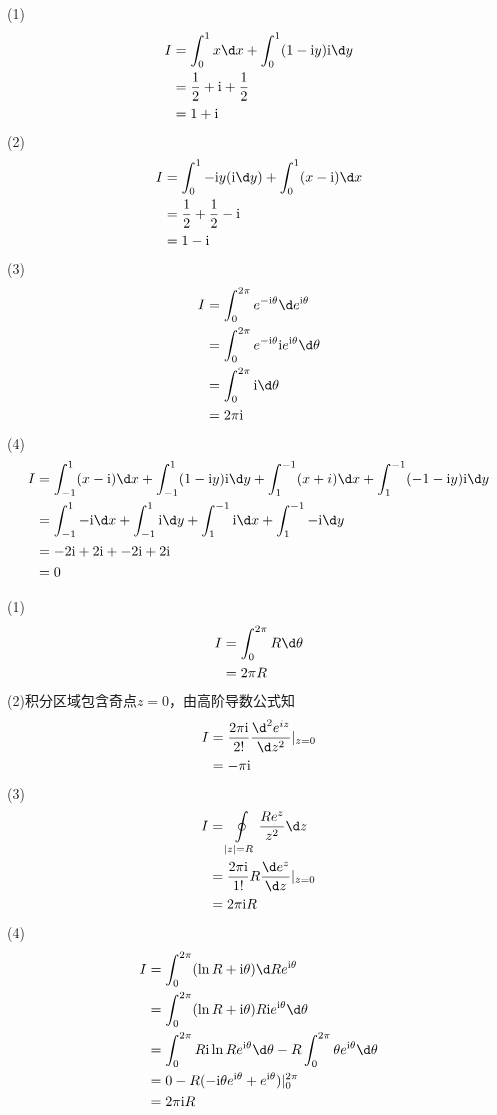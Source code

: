 \documentclass{phyasgn}
\renewcommand{\i}{\mathrm{i}}
\begin{document}
\begin{sol}[1]
(1)$$\begin{aligned}
  I&=\int_{0}^{1}x\d x+\int_{0}^{1}(1-\i y)\i \d y\\
  &=\frac{1}{2}+\i +\frac{1}{2}\\
  &=1+\i
\end{aligned}$$
(2)$$\begin{aligned}
  I&=\int_{0}^{1}-\i y(\i \d y)+\int_{0}^{1}(x-\i)\d x\\
  &=\frac{1}{2}+\frac{1}{2}-\i\\
  &=1-\i
\end{aligned}$$
(3)$$\begin{aligned}
  I&=\int_{0}^{2\pi}e^{-\i \theta}\d e^{\i\theta}\\
  &=\int_{0}^{2\pi}e^{-\i \theta}\i e^{\i\theta}\d \theta\\
  &=\int_{0}^{2\pi}\i\d\theta\\
  &=2\pi\i
\end{aligned}$$
(4)$$\begin{aligned}
  I&=\int_{-1}^{1}(x-\i)\d x+\int_{-1}^{1}(1-\i y)\i\d y+\int_{1}^{-1}(x+i)\d x+\int_{1}^{-1}(-1-\i y)\i\d y\\
  &=\int_{-1}^{1}-\i \d x+\int_{-1}^{1}\i \d y+\int_{1}^{-1}\i \d x+\int_{1}^{-1}-\i \d y\\
  &=-2\i+2\i+-2\i+2\i\\
  &=0
\end{aligned}$$
 \end{sol}\par

\begin{sol}[2]
  (1)$$\begin{aligned}
    I&=\int_{0}^{2\pi}R\d \theta\\
    &=2\pi R
  \end{aligned}$$
  (2)积分区域包含奇点$z=0$，由高阶导数公式知
  $$\begin{aligned}
    I&=\frac{2\pi \i}{2!}\frac{\d^2e^{iz}}{\d z^2}|_{z=0}\\
    &=-\pi \i
  \end{aligned}$$
  (3)$$\begin{aligned}
    I&=\oint\limits_{|z|=R}\frac{Re^z}{z^2}\d z\\
    &=\frac{2\pi\i}{1!}R\frac{\d e^z}{\d z}|_{z=0}\\
    &=2\pi\i R
  \end{aligned}$$
  (4)$$\begin{aligned}
    I&=\int_{0}^{2\pi}(\ln R+\i\theta)\d Re^{\i\theta}\\
    &=\int_{0}^{2\pi}(\ln R+\i\theta) R\i e^{\i\theta}\d\theta\\
    &=\int_{0}^{2\pi}R\i\ln Re^{\i\theta}\d\theta-R\int_{0}^{2\pi}\theta e^{\i\theta}\d\theta\\
    &=0-R(-\i\theta e^{\i\theta}+e^{\i\theta})|_{0}^{2\pi}\\
    &=2\pi\i R
  \end{aligned}$$
 \end{sol}\par
\end{document}
